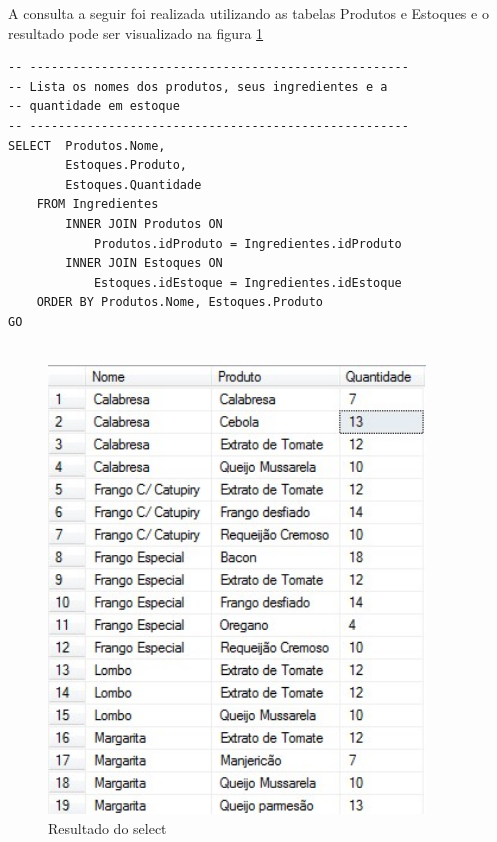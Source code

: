 \documentclass[
	12pt,				%
	openright,			%
	oneside,			%
	a4paper,			%
	chapter=TITLE,		%
	section=TITLE,		%
	english,			%
	brazil				%
	]{abntex2}
\begin{document}
    A consulta a seguir foi realizada utilizando as tabelas Produtos e Estoques  
    e o resultado pode ser visualizado na figura \ref{select02}
    \begin{lstlisting}
-- -----------------------------------------------------
-- Lista os nomes dos produtos, seus ingredientes e a
-- quantidade em estoque
-- -----------------------------------------------------
SELECT  Produtos.Nome, 
        Estoques.Produto, 
        Estoques.Quantidade 
    FROM Ingredientes
	    INNER JOIN Produtos ON 
	        Produtos.idProduto = Ingredientes.idProduto 
    	INNER JOIN Estoques ON 
        	Estoques.idEstoque = Ingredientes.idEstoque 
	ORDER BY Produtos.Nome, Estoques.Produto
GO    
    
    \end{lstlisting}
    \begin{figure}[h]
         \centering
         \includegraphics[width=10cm,keepaspectratio]{Imgs/Select_002}
         \caption{Resultado do select}
         \label{select02}
    \end{figure}

    \newpage
    
\end{document}
